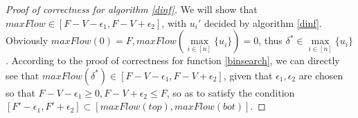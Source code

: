 \begin{proof}[Proof of correctness for algorithm \ref{dinf}]
   We will show that $maxFlow \in [F - V - \epsilon_1, F - V + \epsilon_2]$, with $u_i'$ decided by algorithm
   \ref{dinf}. \\
   Obviously $maxFlow(0) = F, maxFlow(\max\limits_{i \in [n]}\{u_i\}) = 0$, thus $\delta^* \in
   \max\limits_{i \in [n]}\{u_i\}$. According to the proof of correctness for function \ref{binsearch},
   we can directly see that $maxFlow(\delta^*) \in [F - V - \epsilon_1, F - V + \epsilon_2]$, given that
   $\epsilon_1, \epsilon_2$ are chosen so that $F - V - \epsilon_1 \geq 0, F - V + \epsilon_2 \leq F$, so as to satisfy
   the condition $[F' - \epsilon_1, F' + \epsilon_2] \subset [maxFlow(top),maxFlow(bot)]$.
\end{proof}
